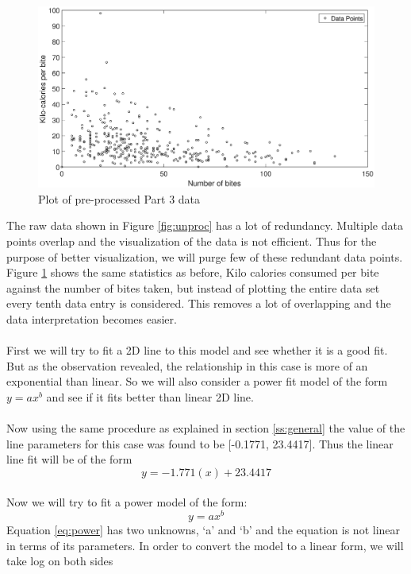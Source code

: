\documentclass[12pt]{article}
\begin{document}
\begin{figure}[t]
\centering
	\includegraphics[width=\textwidth]{dataC_reduced}
	\caption{Plot of pre-processed Part 3 data }
	\label{fig:proc}
\end{figure}
\noindent
The raw data shown in Figure \ref{fig:unproc} has a lot of redundancy. Multiple data points overlap and the visualization of the data is not efficient. Thus for the purpose of better visualization, we will purge few of these redundant data points. Figure \ref{fig:proc} shows the same statistics as before, Kilo calories consumed per bite against the number of bites taken, but instead of plotting the entire data set  every tenth data entry is considered. This removes a lot of overlapping and the data interpretation becomes easier.  \\
\\
First we will try to fit a 2D line to this model and see whether it is a good fit. But as the observation revealed, the relationship in this case is more of an exponential than linear. So we will also consider a power fit model of the form $y = ax^b$ and see if it fits better than linear 2D line. \\
\\
Now using the same procedure as explained in section \ref{ss:general} the value of the line parameters for this case was found to be [-0.1771, 23.4417]. Thus the linear line fit will be of the form 
\begin{equation}
y = -1.771(x) + 23.4417
\label{ans:C}
\end{equation} \\
Now we will try to fit a power model of the form:
\begin{equation}
y = ax^b
\label{eq:power}
\end{equation}
Equation \ref{eq:power} has two unknowns, \lq{}a\rq{} and \lq{}b\rq{} and the equation is not linear in terms of its parameters. In order to convert the model to a linear form, we will take log on both sides
\end{document}
